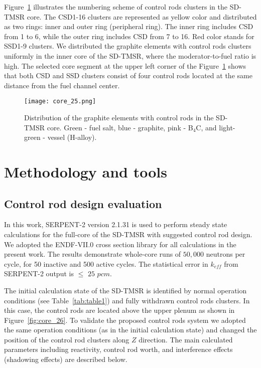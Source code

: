 Figure~\ref{fig:core_25} illustrates the numbering scheme of control rods 
clusters in the SD-TMSR core.
The CSD1-16 clusters are represented as yellow color and distributed as two rings: inner and outer ring (peripheral ring). The inner ring includes CSD from 1 to 6, while the outer ring includes CSD from 7 to 16. Red color stands for SSD1-9 clusters.
We distributed the graphite elements with control rods clusters uniformly in 
the inner core of the SD-TMSR, where the moderator-to-fuel ratio is high.
The selected core segment at the upper left corner of the 
Figure~\ref{fig:core_25} shows that both CSD and SSD clusters consist of four 
control rods located at the same distance from the fuel channel center.
\begin{figure}[t!]  %
	\centering
	\hspace{+0.65in}
	\texttt{[image: core\_25.png]}
	\caption{Distribution of the graphite elements with control rods in the SD-TMSR core. Green - fuel salt, blue - graphite, pink - B$_4$C, and light-green - vessel (H-alloy).}
	\label{fig:core_25}
\end{figure}

\section{Methodology and tools} \label{Methodology-and-tools}
\subsection{Control rod design evaluation}
In this work, SERPENT-2 version 2.1.31 \cite{leppanen2014serpent} is used to 
perform steady state calculations for the full-core of the SD-TMSR with 
suggested control rod design. We adopted the ENDF-VII.0 cross section library 
for all calculations in the present work. The results demonstrate whole-core 
runs of $50,000$ neutrons per cycle, for 50 inactive and 500 active cycles. The 
statistical error in $k_{eff}$ from SERPENT-2 output is $\leq$ $25$ 
$pcm$.

The initial calculation state of the SD-TMSR is identified by normal operation 
conditions (see Table~\ref{tab:table1}) and fully withdrawn control rods 
clusters. In this case, the control rods are located above the upper plenum as 
shown in Figure~\ref{fig:core_26}. To validate the proposed control rods 
system we adopted the same operation conditions (as in the initial calculation 
state) and changed the position of the control rod clusters along $Z$ 
direction. The main calculated parameters including reactivity, control rod 
worth, and interference effects (shadowing effects) are described below.

